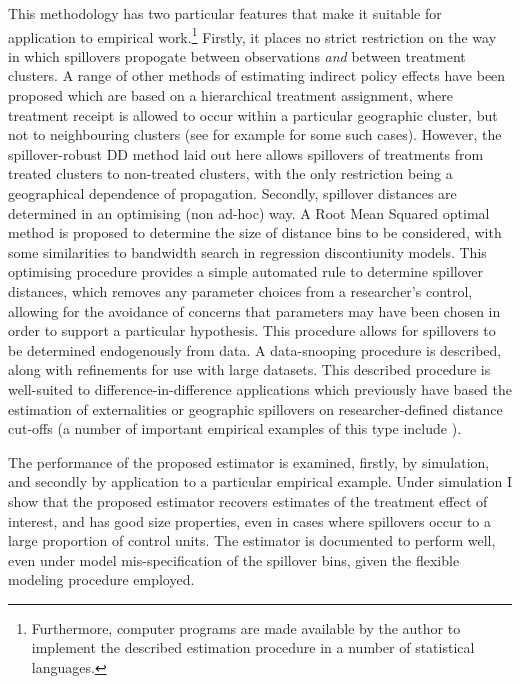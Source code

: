 \documentclass[12pt]{article}
\begin{document}
\begin{spacing}{1.3}
This methodology has two particular features that make it suitable for
application to empirical work.\footnote{Furthermore, computer programs are made
  available by the author to implement the described estimation procedure in
  a number of statistical languages.}  Firstly, it places no strict restriction
on the way in which spillovers propogate between observations \emph{and}
between treatment clusters.  A range of other methods of estimating indirect
policy effects have been proposed which are based on a hierarchical
treatment assignment, where treatment receipt is allowed to occur within a
particular geographic cluster, but not to neighbouring clusters (see for example
\citet{HudgensHalloran2008,LiuHudgens2014,Bairdetal2014} for some such cases).
However, the spillover-robust DD method laid out here allows spillovers
of treatments from treated clusters to non-treated clusters, with the only
restriction being a geographical dependence of propagation.  Secondly,
spillover distances are determined in an optimising (non ad-hoc) way.  A
Root Mean Squared optimal method is proposed to determine the size of distance
bins to be considered, with some similarities to bandwidth search in regression
discontiunity models.  This optimising procedure provides a simple automated
rule to determine spillover distances, which removes any parameter choices from
a researcher's control, allowing for the avoidance of concerns that parameters
may have been chosen in order to support a particular hypothesis.  This
procedure allows for spillovers to be determined endogenously from data.
A data-snooping procedure is described, along with refinements for use with
large datasets.  This described procedure is well-suited to
difference-in-difference applications which previously have based the
estimation of externalities or geographic spillovers on researcher-defined
distance cut-offs (a number of important empirical examples of this type
include \citet{MiguelKremer2004,Almondetal2009}).

The performance of the proposed estimator is examined, firstly, by simulation,
and secondly by application to a particular empirical example.  Under
simulation I show that the proposed estimator recovers estimates of the
treatment effect of interest, and has good size properties, even in cases
where spillovers occur to a large proportion of control units.  The estimator
is documented to perform well, even under model mis-specification of the
spillover bins, given the flexible modeling procedure employed.


\end{spacing}
\end{document}

